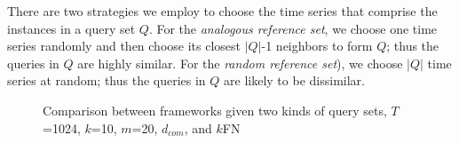 There are two strategies we employ to choose the time series that
comprise the instances in a query set $Q$.
For the \emph{analogous reference set}, we choose one time series randomly
and then choose its closest $|Q|$-1 neighbors to form $Q$; thus the queries
in $Q$ are highly similar.
For the \emph{random reference set}), we choose $|Q|$ time series at random;
thus the queries in $Q$ are likely to be dissimilar.

\begin{figure}[tb]
\centering
{}
\vspace{-0.05in}
\caption{\label{fig:1}
Comparison between frameworks given two kinds of query sets, $T$=1024, 
$k$=10, $m$=20, $d_{com}$, and $k$FN}
\vspace{-0.05in}
\end{figure}

